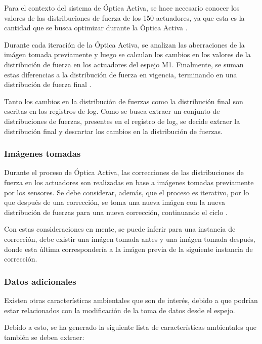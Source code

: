 Para el contexto del sistema de Óptica Activa, se hace necesario conocer los valores de las distribuciones de fuerza de los 150 actuadores, ya que esta es la cantidad que se busca optimizar durante la Óptica Activa \cite{eso1998vlt}. 

Durante cada iteración de la Óptica Activa, se analizan las aberraciones de la imágen tomada previamente y luego se calculan los cambios en los valores de la distribución de fuerza en los actuadores del espejo M1. Finalmente, se suman estas diferencias a la distribución de fuerza en vigencia, terminando en una distribución de fuerza final \cite{wilson1987active}.

Tanto los cambios en la distribución de fuerzas como la distribución final son escritas en los registros de log. Como se busca extraer un conjunto de distribuciones de fuerzas, presentes en el registro de log, se decide extraer la distribución final y descartar los cambios en la distribución de fuerzas.

\subsubsection{Imágenes tomadas}

Durante el proceso de Óptica Activa, las correcciones de las distribuciones de fuerza en los actuadores son realizadas en base a imágenes tomadas previamente por los sensores. Se debe considerar, además, que el proceso es iterativo, por lo que después de una corrección, se toma una nueva imágen con la nueva distribución de fuerzas para una nueva corrección, continuando el ciclo \cite{eso1998vlt}.

Con estas consideraciones en mente, se puede inferir para una instancia de corrección, debe existir una imágen tomada antes y una imágen tomada después, donde esta última correspondería a la imágen previa de la siguiente instancia de corrección.

\subsubsection{Datos adicionales}

Existen otras características ambientales que son de interés, debido a que  podrían estar relacionados con la modificación de la toma de datos desde el espejo.

Debido a esto, se ha generado la siguiente lista de características ambientales que también se deben extraer:

